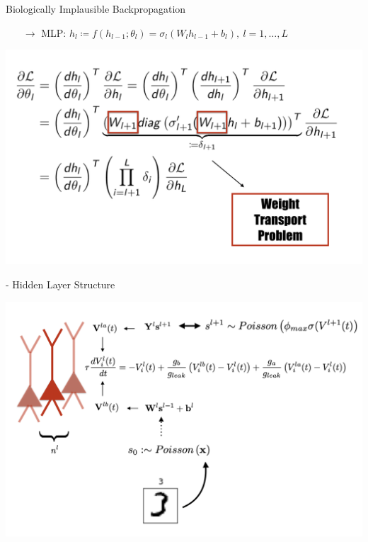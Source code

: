 \documentclass[dvipsnames, usenames]{beamer}
\begin{document}

\begin{frame}[noframenumbering]{Biologically Implausible Backpropagation}

\begin{itemize}
	\item[$\rightarrow$] MLP: $h_l \coloneqq f(h_{l-1}; \theta_l) = \sigma_l (W_l h_{l-1} + b_l), \ l=1,\dots, L$
\end{itemize}

\centering
\includegraphics[width=1.1\textwidth]{../figures/report/backprop_2}

\end{frame}

\begin{frame}[noframenumbering]{\citet{guerguiev2017} - Hidden Layer Structure}

\centering 
\includegraphics[width=1.05\textwidth]{../figures/report/hidden_2}
\end{frame}
\end{document}
